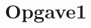 \documentclass[10pt,reqno]{article}
\begin{document}
\maketitle







\section{Opgave1}
\end{document}
